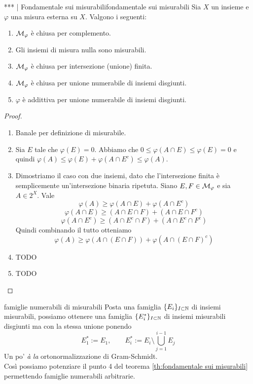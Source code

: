 \begin{theorem}{*** | Fondamentale sui misurabili}{fondamentale sui misurabili}
    Sia $X$ un insieme e $\varphi$ una misura esterna su $X$. Valgono i seguenti:\begin{enumerate}
        \item $\mathcal{M}_\varphi$ è chiusa per complemento.
        \item Gli insiemi di misura nulla sono misurabili.
        \item $\mathcal{M}_\varphi$ è chiusa per intersezione (unione) finita.
        \item $\mathcal{M}_\varphi$ è chiusa per unione numerabile di insiemi disgiunti.
        \item $\varphi$ è addittiva per unione numerabile di insiemi disgiunti.
    \end{enumerate}
    \begin{proof}
        \begin{enumerate}
            \item Banale per definizione di misurabile.
            \item Sia $E$ tale che $\varphi(E) = 0$. Abbiamo che $0\leq \varphi(A\cap E)\leq \varphi(E)=0$ e quindi $\varphi(A) \leq \varphi(E) + \varphi(A \cap E^c)\leq \varphi(A)$.
            \item Dimostriamo il caso con due insiemi, dato che l'intersezione finita è semplicemente un'intersezione binaria ripetuta. Siano $E,F \in \mathcal{M}_\varphi$ e sia $A \in 2^X$. Vale 
            \[\varphi(A)\ge \varphi(A\cap E) + \varphi(A \cap E^c)\]
            \[\varphi(A\cap E) \ge (A\cap E\cap F) + (A\cap E \cap F^c)\]
            \[\varphi(A\cap E^c) \ge (A\cap E^c\cap F) + (A\cap E^c \cap F^c)\]
            Quindi combinando il tutto otteniamo
            \[\varphi(A) \ge \varphi(A\cap(E\cap F)) + \varphi(A\cap(E\cap F)^c)\]
            \item TODO
            \item TODO
        \end{enumerate}
    \end{proof}
\end{theorem}

\begin{remark}{}{famiglie numerabili di misurabili}
    Posta una famiglia $\{E_i\}_{I\subset \mathbb{N}}$ di insiemi misurabili, possiamo ottenere una famiglia $\{E_i^*\}_{I\subset \mathbb{N}}$ di insiemi misurabili disgiunti ma con la stessa unione ponendo
    \[E_1^* := E_1,\qquad E_i^*:= E_i \setminus \bigcup_{j=1}^{i-1} E_j\]
    Un po' \textit{à la} ortonormalizzazione di Gram-Schmidt.\\
    Così possiamo potenziare il punto 4 del teorema \ref{th:fondamentale sui misurabili} permettendo famiglie numerabili arbitrarie.
\end{remark}

